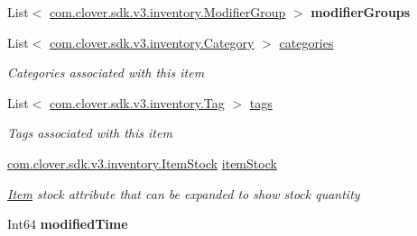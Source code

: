 \begin{DoxyCompactItemize}
List$<$ \hyperlink{classcom_1_1clover_1_1sdk_1_1v3_1_1inventory_1_1_modifier_group}{com.\+clover.\+sdk.\+v3.\+inventory.\+Modifier\+Group} $>$ {\bfseries modifier\+Groups}
\item 
List$<$ \hyperlink{classcom_1_1clover_1_1sdk_1_1v3_1_1inventory_1_1_category}{com.\+clover.\+sdk.\+v3.\+inventory.\+Category} $>$ \hyperlink{classcom_1_1clover_1_1sdk_1_1v3_1_1inventory_1_1_item_ad471a26603e3090feb14480897fc1626}{categories}
\begin{DoxyCompactList}\small\item\em Categories associated with this item \end{DoxyCompactList}\item 
List$<$ \hyperlink{classcom_1_1clover_1_1sdk_1_1v3_1_1inventory_1_1_tag}{com.\+clover.\+sdk.\+v3.\+inventory.\+Tag} $>$ \hyperlink{classcom_1_1clover_1_1sdk_1_1v3_1_1inventory_1_1_item_a5d623c51808818ce0363e8911c68e6dd}{tags}
\begin{DoxyCompactList}\small\item\em Tags associated with this item \end{DoxyCompactList}\item 
\hyperlink{classcom_1_1clover_1_1sdk_1_1v3_1_1inventory_1_1_item_stock}{com.\+clover.\+sdk.\+v3.\+inventory.\+Item\+Stock} \hyperlink{classcom_1_1clover_1_1sdk_1_1v3_1_1inventory_1_1_item_a6edcd5227a75b71a8ae9436595219f6f}{item\+Stock}
\begin{DoxyCompactList}\small\item\em \hyperlink{classcom_1_1clover_1_1sdk_1_1v3_1_1inventory_1_1_item}{Item} stock attribute that can be expanded to show stock quantity \end{DoxyCompactList}\item 
\mbox{\label{classcom_1_1clover_1_1sdk_1_1v3_1_1inventory_1_1_item_a2b74add66faf4233a9d29c5f34b3dd57}} 
Int64 {\bfseries modified\+Time}
\end{DoxyCompactItemize}


